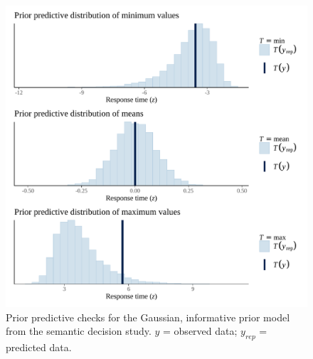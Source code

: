 \documentclass[
  12pt,
  man,floatsintext]{apa7}
\begin{document}
\begin{figure}

{\centering \includegraphics[width=0.8\linewidth]{../semanticdecision/bayesian_analysis/prior_predictive_checks/plots/semanticdecision_priorpredictivecheck_informativepriors} 

}

\caption{Prior predictive checks for the Gaussian, informative prior model from the semantic decision study. \(y\) = observed data; \(y_{rep}\) = predicted data.}\label{fig:semanticdecision-priorpredictivecheck-informativepriors}
\end{figure}
\end{document}

